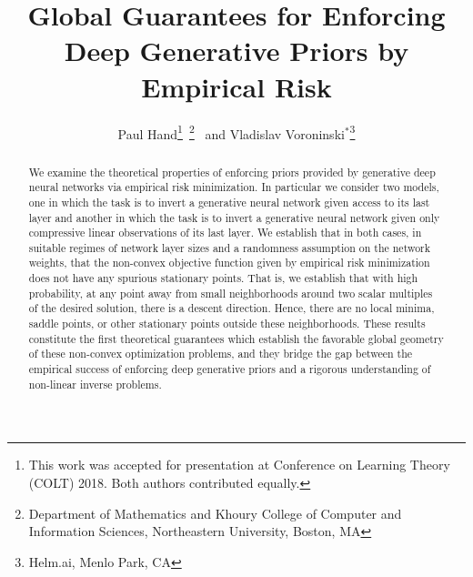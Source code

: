 \documentclass[11pt]{article}
\title{Global Guarantees for Enforcing Deep Generative Priors by Empirical Risk}
\author{ Paul Hand\thanks{This work was accepted for presentation at Conference on Learning Theory (COLT) 2018.  Both authors contributed equally.  }\ \thanks{Department of Mathematics and Khoury College of Computer and Information Sciences, Northeastern University, Boston, MA} \  and Vladislav Voroninski$^*$\thanks{Helm.ai, Menlo Park, CA}}
\begin{document}

\maketitle

\begin{abstract}
We examine the theoretical properties of enforcing priors provided by generative deep neural networks via empirical risk minimization. In particular we consider two models, one in which the task is to invert a generative neural network given access to its last layer and another in which the task is to invert a generative neural network given only compressive linear observations of its last layer.  We establish that in both cases, in suitable regimes of network layer sizes and a randomness assumption on the network weights, that the non-convex objective function given by empirical risk minimization does not have any spurious stationary points. That is, we establish that with high probability, at any point away from small neighborhoods around two scalar multiples of the desired solution, there is a descent direction. Hence, there are no local minima, saddle points, or other stationary points outside these neighborhoods.  These results constitute the first theoretical guarantees which establish the favorable global geometry of these non-convex optimization problems, and they bridge the gap between the empirical success of  enforcing deep generative priors and a rigorous understanding of non-linear inverse problems.\\
\end{abstract}
\end{document}
